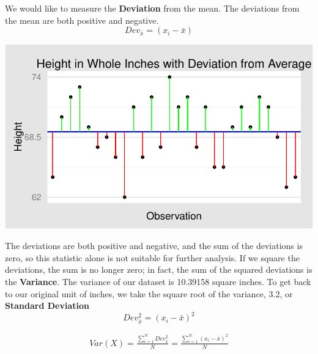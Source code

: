 \documentclass[nohyper,justified]{tufte-handout}\usepackage[]{graphicx}\usepackage[]{color}
\makeatletter
\def\maxwidth{ %
  \ifdim\Gin@nat@width>\linewidth
    \linewidth
  \else
    \Gin@nat@width
  \fi
}
\newenvironment{knitrout}{}{} %
\makeatother
\begin{document}
We would like to measure the \textbf{Deviation} from the mean. The deviations from the mean are both positive and negative.
\begin{equation*}
Dev_{\bar{x}}=(x_i-\bar{x}) 
\end{equation*}


\begin{knitrout}
\color{fgcolor}

{\centering \includegraphics[width=\maxwidth]{figure/graphics-mean-center-chart-1} 

}



\end{knitrout}

The deviations are both positive and negative, and the sum of the deviations is zero, so this statistic alone is not suitable for further analysis. If we square the deviations, the sum is no longer zero; in fact, the sum of the squared deviations is the \textbf{Variance}. The variance of our dataset is 10.39158 square inches. To get back to our original unit of inches, we take the square root of the variance, 3.2, or \textbf{Standard Deviation}
\begin{equation*}
Dev_{\bar{x}}^2=(x_i-\bar{x})^2 
\end{equation*}

\begin{multline*}
Var(X)=\frac{\sum_{i=1}^{N} Dev_{\bar{x}}^2}{N}=\frac{\sum_{i=1}^{N} (x_i-\bar{x})^2}{N}
\end{multline*}
\end{document}
